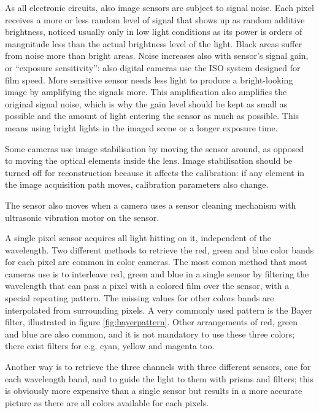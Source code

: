
As all electronic circuits, also image sensors are subject to signal noise.
Each pixel receives a more or less random level of signal that shows up as random additive brightness, noticed usually only in low light conditions as its power is orders of mangnitude less than the actual brightness level of the light.
Black areas suffer from noise more than bright areas.
Noise increases also with sensor's signal gain, or ``exposure sensitivity'': also digital cameras use the ISO system designed for film speed.
More sensitive sensor needs less light to produce a bright-looking image by amplifying the signals more.
This amplification also amplifies the original signal noise, which is why the gain level should be kept as small as possible and the amount of light entering the sensor as much as possible.
This means using bright lights in the imaged scene or a longer exposure time.


Some cameras use image stabilisation by moving the sensor around, as opposed to moving the optical elements inside the lens.
Image stabilisation should be turned off for reconstruction because it affects the calibration: if any element in the image acquisition path moves, calibration parameters also change.

The sensor also moves when a camera uses a sensor cleaning mechanism with ultrasonic vibration motor on the sensor.


A single pixel sensor acquires all light hitting on it, independent of the wavelength.
Two different methods to retrieve the red, green and blue color bands for each pixel are common in color cameras.
The most comon method that most cameras use is to interleave red, green and blue in a single sensor by filtering the wavelength that can pass a pixel with a colored film over the sensor, with a special repeating pattern.
The missing values for other colors bands are interpolated from surrounding pixels.
A very commonly used pattern is the Bayer filter, illustrated in figure \ref{fig:bayerpattern}.
Other arrangements of red, green and blue are also common, and it is not mandatory to use these three colors; there exist filters for e.g. cyan, yellow and magenta too.

Another way is to retrieve the three channels with three different sensors, one for each wavelength band, and to guide the light to them with prisms and filters; this is obviously more expensive than a single sensor but results in a more accurate picture as there are all colors available for each pixels.

